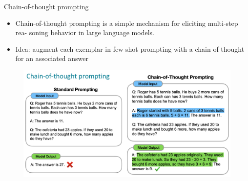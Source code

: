 \documentclass[handout]{beamer}
\begin{document}
\begin{frame}{Chain-of-thought prompting}

\begin{scriptsize}
\begin{itemize}
\item Chain-of-thought prompting is a simple mechanism for eliciting multi-step rea-
soning behavior in large language models.
\item  Idea: augment each exemplar in few-shot prompting with a chain of thought for an associated answer \cite{wei2022chain}
\end{itemize}
\end{scriptsize}


 \begin{figure}[h]
        	\includegraphics[scale = 0.3]{pics/chainoftought.png}
        \end{figure}



\end{frame}
\end{document}

